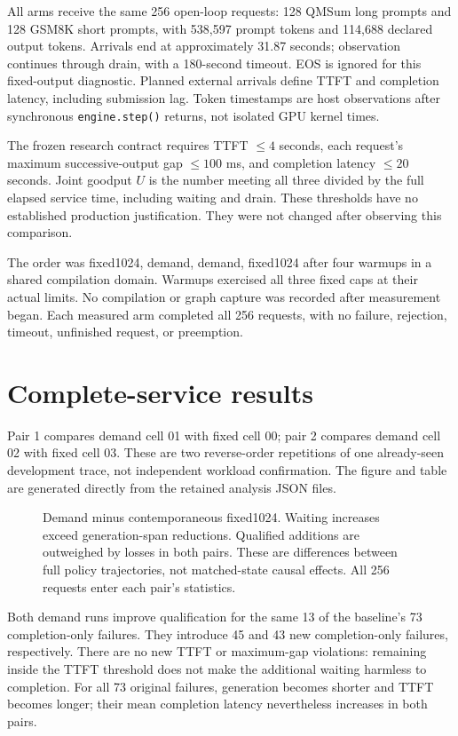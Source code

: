 \documentclass[10pt,a4paper]{article}
\begin{document}
All arms receive the same 256 open-loop requests: 128 QMSum long prompts and
128 GSM8K short prompts, with 538,597 prompt tokens and 114,688 declared output
tokens. Arrivals end at approximately 31.87 seconds; observation continues through
drain, with a 180-second timeout. EOS is ignored for this fixed-output diagnostic.
Planned external arrivals define TTFT and completion latency, including submission
lag. Token timestamps are host observations after synchronous \texttt{engine.step()}
returns, not isolated GPU kernel times.

The frozen research contract requires TTFT $\leq4$ seconds, each request's maximum
successive-output gap $\leq100$ ms, and completion latency $\leq20$ seconds.
Joint goodput $U$ is the number meeting all three divided by the full elapsed
service time, including waiting and drain. These thresholds have no established
production justification. They were not changed after observing this comparison.

The order was fixed1024, demand, demand, fixed1024 after four warmups in a shared
compilation domain. Warmups exercised all three fixed caps at their actual limits.
No compilation or graph capture was recorded after measurement began. Each measured
arm completed all 256 requests, with no failure, rejection, timeout, unfinished
request, or preemption.

\section*{Complete-service results}

\par
Pair 1 compares demand cell 01 with fixed cell 00; pair 2 compares demand cell 02
with fixed cell 03. These are two reverse-order repetitions of one already-seen
development trace, not independent workload confirmation. The figure and table
are generated directly from the retained analysis JSON files.

\begin{figure}[!ht]
\centering

\caption{Demand minus contemporaneous fixed1024. Waiting increases exceed
generation-span reductions. Qualified additions are outweighed by losses in both
pairs. These are differences between full policy trajectories, not matched-state
causal effects. All 256 requests enter each pair's statistics.}
\end{figure}

Both demand runs improve qualification for the same 13 of the baseline's 73
completion-only failures. They introduce 45 and 43 new completion-only failures,
respectively. There are no new TTFT or maximum-gap violations: remaining inside the
TTFT threshold does not make the additional waiting harmless to completion.
For all 73 original failures, generation becomes shorter and TTFT becomes longer;
their mean completion latency nevertheless increases in both pairs.
\end{document}
